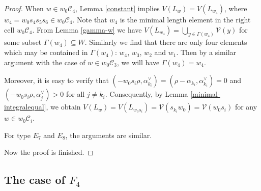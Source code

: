 \documentclass[11pt, reqno]{amsart}
\renewcommand{\subset}{\subseteq}
\theoremstyle{definition}
\numberwithin{equation}{section}
\begin{document}
\begin{proof}
When $w \in w_0\mathcal{C}_4$, Lemma \ref{constant} implies $V(L_w) = V(L_{w_4})$, where  $w_4=w_0s_4s_5s_6 \in w_0\mathcal{C}_4$. Note that $w_4$ is the minimal length element in  the right cell $w_0\mathcal{C}_4$. From Lemma \ref{gamma-w} we have $V(L_{w_4})=\bigcup\limits_{y\in \Gamma(w_4)}\mathcal{V}(y)$ for some subset $\Gamma(w_4)\subset W$.
Similarly we find that there are only four elements which may be contained in  $\Gamma(w_4)$: $w_4$, $w_3$, $w_2$ and $w_1$. Then by a similar argument with the case of $w\in w_0\mathcal{C}_3 $, we will have $\Gamma(w_4)=w_4$.




Moreover, it is easy to verify that $(-w_0s_i\rho,\alpha_{k_i}^{\vee})=(\rho-\alpha_{k_i},\alpha_{k_i}^{\vee})=0$ and $(-w_0s_i\rho,\alpha_j^{\vee})>0$ for all $j\neq k_i$. Consequently, by Lemma \ref{minimal-integralequal}, we obtain $V(L_w)=V(L_{w_0s_i})=\mathcal V(s_{k_i}w_0)=\mathcal V(w_0s_i)$ for any $w\in w_0\mathcal{C}_i$.



For type $E_7$ and $E_8$, the arguments are similar.

Now the proof is finished.

\end{proof}

























\subsection{The case of $F_4$}\label{typef4}
\end{document}
